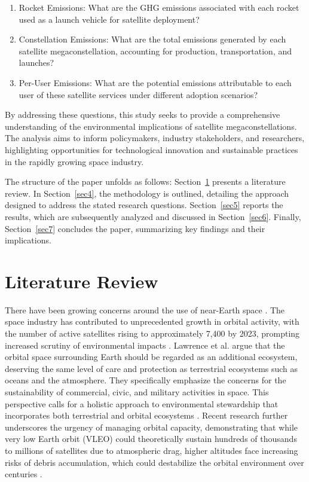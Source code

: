 \documentclass[pdflatex,sn-mathphys-num]{sn-jnl}
\theoremstyle{thmstyleone}%
\theoremstyle{thmstyletwo}%
\theoremstyle{thmstylethree}%
\begin{document}
\begin{enumerate}
    \item Rocket Emissions: What are the GHG emissions associated with each rocket used as a launch vehicle for satellite deployment?
    \item Constellation Emissions: What are the total emissions generated by each satellite megaconstellation, accounting for production, transportation, and launches?
    \item Per-User Emissions: What are the potential emissions attributable to each user of these satellite services under different adoption scenarios?
\end{enumerate}

By addressing these questions, this study seeks to provide a comprehensive understanding of the environmental implications of satellite megaconstellations. The analysis aims to inform policymakers, industry stakeholders, and researchers, highlighting opportunities for technological innovation and sustainable practices in the rapidly growing space industry.

The structure of the paper unfolds as follows: Section~\ref{sec2} presents a literature review. In Section~\ref{sec4}, the methodology is outlined, detailing the approach designed to address the stated research questions. Section~\ref{sec5} reports the results, which are subsequently analyzed and discussed in Section~\ref{sec6}. Finally, Section~\ref{sec7} concludes the paper, summarizing key findings and their implications.

\section{Literature Review}\label{sec2}

There have been growing concerns around the use of near-Earth space \citep{rossi_future_2024, dambrosio_capacity_2022, sanchez-ortiz_outreach_2025}. The space industry has contributed to unprecedented growth in orbital activity, with the number of active satellites rising to approximately 7,400 by 2023, prompting increased scrutiny of environmental impacts \citep{jones_green_2023}. Lawrence et al. argue that the orbital space surrounding Earth should be regarded as an additional ecosystem, deserving the same level of care and protection as terrestrial ecosystems such as oceans and the atmosphere. They specifically emphasize the concerns for the sustainability of commercial, civic, and military activities in space. This perspective calls for a holistic approach to environmental stewardship that incorporates both terrestrial and orbital ecosystems \citep{lawrence_case_2022}. Recent research further underscores the urgency of managing orbital capacity, demonstrating that while very low Earth orbit (VLEO) could theoretically sustain hundreds of thousands to millions of satellites due to atmospheric drag, higher altitudes face increasing risks of debris accumulation, which could destabilize the orbital environment over centuries \citep{lavezzi_stable_2024}.
\end{document}
